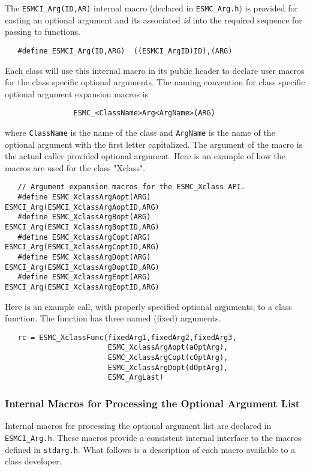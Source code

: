 The \texttt{ESMCI\_Arg(ID,AR)} internal macro (declared in \texttt{ESMC\_Arg.h})
is provided for casting an optional argument and its associated \textit{id} into
the required sequence for passing to functions.
\begin{verbatim}
   #define ESMCI_Arg(ID,ARG)  ((ESMCI_ArgID)ID),(ARG)
\end{verbatim}
\noindent
Each class will use this internal macro in its public header to declare
user macros for the class specific optional arguments. 
The naming convention for class specific optional argument expansion macros 
is
\begin{verbatim}
                ESMC_<ClassName>Arg<ArgName>(ARG)
\end{verbatim}
where \texttt{ClassName} is the
name of the class and \texttt{ArgName} is the name of the optional argument with
the first letter capitalized. The argument of the macro is the actual caller
provided optional argument.  Here is an example of how the macros are used for
the class "Xclass".
\begin{verbatim}
   // Argument expansion macros for the ESMC_Xclass API.
   #define ESMC_XclassArgAopt(ARG)  ESMCI_Arg(ESMCI_XclassArgAoptID,ARG)
   #define ESMC_XclassArgBopt(ARG)  ESMCI_Arg(ESMCI_XclassArgBoptID,ARG)
   #define ESMC_XclassArgCopt(ARG)  ESMCI_Arg(ESMCI_XclassArgCoptID,ARG)
   #define ESMC_XclassArgDopt(ARG)  ESMCI_Arg(ESMCI_XclassArgDoptID,ARG)
   #define ESMC_XclassArgEopt(ARG)  ESMCI_Arg(ESMCI_XclassArgEoptID,ARG)
\end{verbatim}
\noindent
Here is an example call, with properly specified optional arguments, to a class
function. The function has three named (fixed) arguments.
\begin{verbatim}
   rc = ESMC_XclassFunc(fixedArg1,fixedArg2,fixedArg3,
                        ESMC_XclassArgAopt(aOptArg),
                        ESMC_XclassArgCopt(cOptArg),
                        ESMC_XclassArgDopt(dOptArg),
                        ESMC_ArgLast)
\end{verbatim}


\subsubsection{Internal Macros for Processing the Optional Argument List}

Internal macros for processing the optional argument list are declared in
\texttt{ESMCI\_Arg.h}. These macros provide a consistent internal interface to
the macros defined in \texttt{stdarg.h}. What follows is a description of each
macro available to a class developer.

